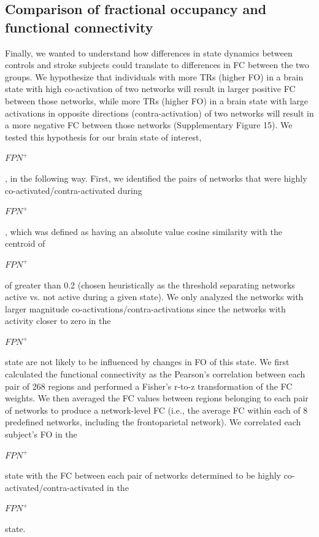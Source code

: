 \documentclass[phd,tocprelim]{cornell}
\begin{document}
    \subsection{Comparison of fractional occupancy and functional connectivity}
    Finally, we wanted to understand how differences in state dynamics between controls and stroke subjects could translate to differences in FC between the two groups. We hypothesize that individuals with more TRs (higher FO) in a brain state with high co-activation of two networks will result in larger positive FC between those networks, while more TRs (higher FO) in a brain state with large activations in opposite directions (contra-activation) of two networks will result in a more negative FC between those networks (Supplementary Figure 15). We tested this hypothesis for our brain state of interest,  \begin{Large}$FPN^+$ \end{Large}, in the following way. First, we identified the pairs of networks that were highly co-activated/contra-activated during  \begin{Large}$FPN^+$ \end{Large}, which was defined as having an absolute value cosine similarity with the centroid of  \begin{Large}$FPN^+$ \end{Large} of greater than 0.2 (chosen heuristically as the threshold separating networks active vs. not active during a given state). We only analyzed the networks with larger magnitude co-activations/contra-activations since the networks with activity closer to zero in the  \begin{Large}$FPN^+$ \end{Large} state are not likely to be influenced by changes in FO of this state. We first calculated the functional connectivity as the Pearson's correlation between each pair of 268 regions and performed a Fisher's r-to-z transformation of the FC weights. We then averaged the FC values between regions belonging to each pair of networks to produce a network-level FC (i.e., the average FC within each of 8 predefined networks, including the frontoparietal network). We correlated each subject's FO in the  \begin{Large}$FPN^+$ \end{Large} state with the FC between each pair of networks determined to be highly co-activated/contra-activated in the  \begin{Large}$FPN^+$ \end{Large} state.
\end{document}
